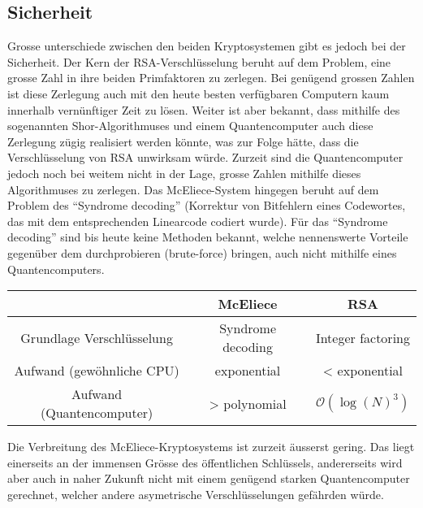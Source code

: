 \subsection{Sicherheit}
Grosse unterschiede zwischen den beiden Kryptosystemen gibt es jedoch bei der Sicherheit.
Der Kern der RSA-Verschlüsselung beruht auf dem Problem, eine grosse Zahl in ihre beiden Primfaktoren zu zerlegen.
Bei genügend grossen Zahlen ist diese Zerlegung auch mit den heute besten verfügbaren Computern kaum innerhalb vernünftiger Zeit zu lösen.
Weiter ist aber bekannt,
dass mithilfe des sogenannten Shor-Algorithmuses \cite{mceliece:shor} und einem Quantencomputer auch diese Zerlegung zügig realisiert werden könnte,
was zur Folge hätte, dass die Verschlüsselung von RSA unwirksam würde.
Zurzeit sind die Quantencomputer jedoch noch bei weitem nicht in der Lage, grosse Zahlen mithilfe dieses Algorithmuses zu zerlegen.
Das McEliece-System hingegen beruht auf dem Problem des ``Syndrome decoding'' (Korrektur von Bitfehlern eines Codewortes, das mit dem entsprechenden Linearcode codiert wurde).
Für das ``Syndrome decoding'' sind bis heute keine Methoden bekannt,
welche nennenswerte Vorteile gegenüber dem durchprobieren (brute-force) bringen,
auch nicht mithilfe eines Quantencomputers.
\begin{center}
\begin{tabular}{c|c|c}
                              &McEliece          &RSA              \\
\hline
    Grundlage Verschlüsselung &Syndrome decoding &Integer factoring\\
    Aufwand (gewöhnliche CPU) &exponential       &< exponential    \\
    Aufwand (Quantencomputer) &> polynomial      &$\mathcal{O}(\log(N)^3)$
\end{tabular}
\end{center}
Die Verbreitung des McEliece-Kryptosystems ist zurzeit äusserst gering.
Das liegt einerseits an der immensen Grösse des öffentlichen Schlüssels,
andererseits wird aber auch in naher Zukunft nicht mit einem genügend starken Quantencomputer gerechnet,
welcher andere asymetrische Verschlüsselungen gefährden würde.
